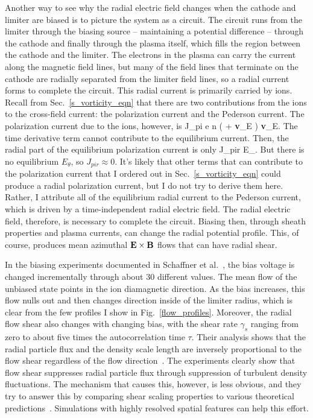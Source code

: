Another way to see why the radial electric field changes when the cathode and limiter are biased is to picture the system as a circuit. The circuit runs from the limiter
through the biasing source -- maintaining a potential difference -- through the cathode and finally through the plasma itself, which fills the region between the cathode and the limiter.
The electrons in the plasma can carry the current along the magnetic field lines, but many of the field lines that terminate on the cathode are radially separated from the limiter field lines,
so a radial current forms to complete the circuit. This radial current is primarily carried by ions. Recall from Sec.~\ref{s_vorticity_eqn} that there are two contributions from the ions
to the cross-field current: the polarization current and the Pederson current. The polarization current due to the ions, however, is
\beq
\label{pol_curr}
J_{pi} \approx e n  \times \left( \pdt + {\bf v}_E \cdot \grad \right) {\bf v}_E.
\eeq
The time derivative term cannot contribute to the equilibrium current. Then, the radial part of the equilibrium polarization current is only
\beq
\label{rad_pol_curr}
J_{pir} \approx {} E_\theta {}.
\eeq
But there is no equilibrium $E_\theta$, so $J_{pir} \approx 0$. It's likely that other terms that can contribute to the polarization current that I ordered out in Sec.~\ref{s_vorticity_eqn}
could produce a radial polarization current, but I do not try to derive them here. Rather, I attribute all of the equilibrium radial current to the Pederson current, which
is driven by a time-independent radial electric field. The radial electric field, therefore, is
necessary to complete the circuit. Biasing then, through sheath properties and plasma currents, can change the radial potential profile.
This, of course, produces mean azimuthal ${\bf E \times B}$ flows that can have radial shear.

In the biasing experiments documented in Schaffner et al.~\cite{schaffner2012,schaffner2013}, the bias voltage is changed incrementally through about $30$ different values. 
The mean flow of the unbiased state points in the ion diamagnetic direction. As the bias increases, this flow nulls out and then changes direction inside of the limiter radius, which is
clear from the few profiles I show in Fig.~\ref{flow_profiles}. Moreover, the radial flow shear also changes with changing bias, with the shear rate $\gamma_s$ ranging from zero to about five times
the autocorrelation time $\tau$. Their analysis shows that the radial particle flux and the density scale length are inversely proportional to the 
flow shear regardless of the flow direction~\cite{schaffner2012}. 
The experiments clearly show that flow shear suppresses radial particle flux through suppression of turbulent density fluctuations. 
The mechanism that causes this, however, is less obvious, and they try to answer this by comparing shear scaling properties to various theoretical predictions~\cite{schaffner2013}.
Simulations with highly resolved spatial features can help this effort.

